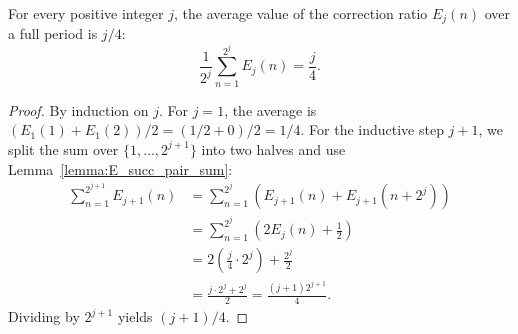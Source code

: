 \begin{theorem}\label{theorem:CRoz_lemma_23}\leanok
For every positive integer $j$, the average value of the correction ratio $E_j(n)$ over a full period is $j/4$:
\begin{equation}
    \frac{1}{2^j} \sum_{n=1}^{2^j} E_j(n) = \frac{j}{4}.
\end{equation}
\end{theorem}
\begin{proof}\leanok
By induction on $j$. For $j=1$, the average is $(E_1(1) + E_1(2))/2 = (1/2 + 0)/2 = 1/4$.
For the inductive step $j+1$, we split the sum over $\{1, \dots, 2^{j+1}\}$ into two halves and use Lemma~\ref{lemma:E_succ_pair_sum}:
\begin{align*}
    \sum_{n=1}^{2^{j+1}} E_{j+1}(n) &= \sum_{n=1}^{2^j} (E_{j+1}(n) + E_{j+1}(n + 2^j)) \\
    &= \sum_{n=1}^{2^j} \left( 2 E_j(n) + \frac{1}{2} \right) \\
    &= 2 \left( \frac{j}{4} \cdot 2^j \right) + \frac{2^j}{2} \\
    &= \frac{j \cdot 2^j + 2^j}{2} = \frac{(j+1) 2^{j+1}}{4}.
\end{align*}
Dividing by $2^{j+1}$ yields $(j+1)/4$.
\end{proof}
